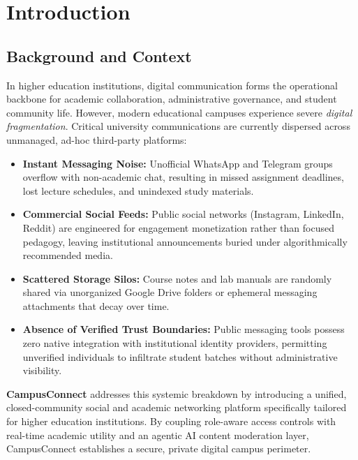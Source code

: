 \documentclass[12pt, a4paper, oneside]{report}
\begin{document}
\tableofcontents
\newpage
\listoffigures
\listoftables
\newpage
{}

\chapter{Introduction}

\section{Background and Context}
In higher education institutions, digital communication forms the operational backbone for academic collaboration, administrative governance, and student community life. However, modern educational campuses experience severe \textit{digital fragmentation}. Critical university communications are currently dispersed across unmanaged, ad-hoc third-party platforms:
\begin{itemize}[leftmargin=0.7cm]
    \item \textbf{Instant Messaging Noise:} Unofficial WhatsApp and Telegram groups overflow with non-academic chat, resulting in missed assignment deadlines, lost lecture schedules, and unindexed study materials.
    \item \textbf{Commercial Social Feeds:} Public social networks (Instagram, LinkedIn, Reddit) are engineered for engagement monetization rather than focused pedagogy, leaving institutional announcements buried under algorithmically recommended media.
    \item \textbf{Scattered Storage Silos:} Course notes and lab manuals are randomly shared via unorganized Google Drive folders or ephemeral messaging attachments that decay over time.
    \item \textbf{Absence of Verified Trust Boundaries:} Public messaging tools possess zero native integration with institutional identity providers, permitting unverified individuals to infiltrate student batches without administrative visibility.
\end{itemize}

\textbf{CampusConnect} addresses this systemic breakdown by introducing a unified, closed-community social and academic networking platform specifically tailored for higher education institutions. By coupling role-aware access controls with real-time academic utility and an agentic AI content moderation layer, CampusConnect establishes a secure, private digital campus perimeter.
\end{document}
